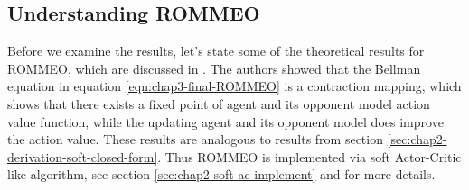 \label{sec:chap3-ROMMEO-interpretation}

\subsection{Understanding ROMMEO}
Before we examine the results, let's state some of the theoretical results for ROMMEO, which are discussed in \cite{tian2019regularized}. The authors showed that the Bellman equation in equation \ref{eqn:chap3-final-ROMMEO} is a contraction mapping, which shows that there exists a fixed point of agent and its opponent model action value function, while the updating agent and its opponent model does improve the action value. These results are analogous to results from section \ref{sec:chap2-derivation-soft-closed-form}. Thus ROMMEO is implemented via soft Actor-Critic like algorithm, see section \ref{sec:chap2-soft-ac-implement} and \cite{tian2019regularized} for more details. 

